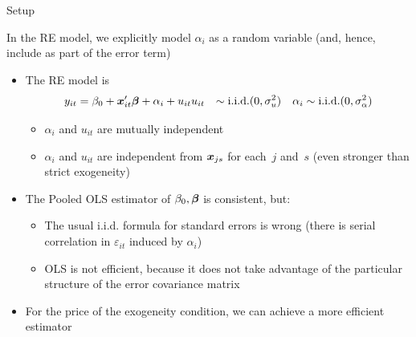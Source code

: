 \documentclass[english, professionalfonts,smaller,xcolor=dvipsnames]{beamer}
\def\\{}%
\begin{document}
\begin{frame}{Setup}

In the RE model, we explicitly model $\alpha_{i}$ as a random variable (and, hence, include as part of the error term)

\begin{itemize}
\item The RE model is
\begin{align*}
y_{it} &= \beta_0 + \vx_{it}' \vbeta + \alpha_i + u_{it}\\
u_{it} &\sim\text{i.i.d.}(0,\sigma_u^2) \quad \alpha_i \sim\text{i.i.d.}(0,\sigma_{\alpha}^2)
\end{align*}
\vspace*{-\baselineskip}
\begin{itemize}
\item $\alpha_i$ and $u_{it}$ are mutually independent
\item $\alpha_i$ and $u_{it}$ are independent from $\bm x_{js}$ for each~$j$ and~$s$ (even stronger than strict exogeneity)
\end{itemize}
\item The Pooled OLS estimator of $\beta_0, \bm \beta$ is consistent, but:
\begin{itemize}
\item The usual i.i.d. formula for standard errors is wrong (there is serial correlation in $\varepsilon_{it}$ induced by $\alpha_i$) 
\item OLS is not efficient, because it does not take advantage of the particular structure of the error covariance matrix 
\end{itemize}
\item For the price of the exogeneity condition, we can achieve a more efficient estimator
\end{itemize}
\end{frame}
\end{document}
